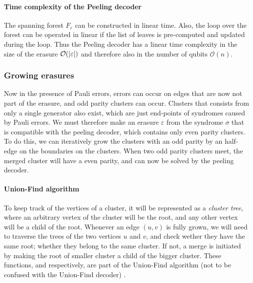 \paragraph{Time complexity of the Peeling decoder}
The spanning forest $F_\varepsilon$ can be constructed in linear time. Also, the loop over the forest can be operated in linear if the list of leaves is pre-computed and updated during the loop. Thus the Peeling decoder has a linear time complexity in the size of the erasure $\mathcal{O}(\abs{\varepsilon})$ and therefore also in the number of qubits $\mathcal{O}(n)$.

\subsubsection{Growing erasures}

Now in the presence of Pauli errors, errors can occur on edges that are now not part of the erasure, and odd parity clusters can occur. Clusters that consists from only a single generator also exist, which are just end-points of syndromes caused by Pauli errors. We must therefore make an erasure $\varepsilon$ from the syndrome $\sigma$ that is compatible with the peeling decoder, which contains only even parity clusters. To do this, we can iteratively grow the clusters with an odd parity by an half-edge on the boundaries on the clusters. When two odd parity clusters meet, the merged cluster will have a even parity, and can now be solved by the peeling decoder.

\paragraph{Union-Find algorithm}


To keep track of the vertices of a cluster, it will be represented as a \emph{cluster tree}, where an arbitrary vertex of the cluster will be the root, and any other vertex will be a child of the root. Whenever an edge $(u,v)$ is fully grown, we will need to traverse the trees of the two vertices $u$ and $v$, and check wether they have the same root; whether they belong to the same cluster. If not, a merge is initiated by making the root of smaller cluster a child of the bigger cluster. These functions,  and  respectively, are part of the Union-Find algorithm (not to be confused with the Union-Find decoder) \cite{tarjan}.


